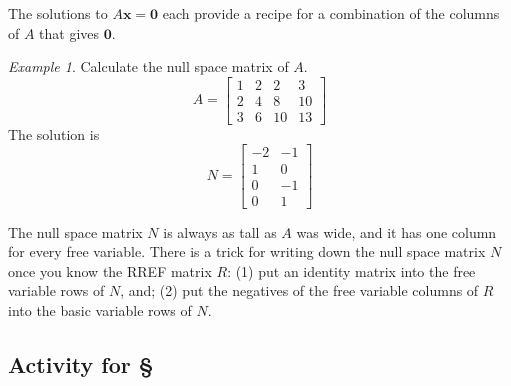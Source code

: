 \documentclass[11pt,oneside]{amsbook}
\theoremstyle{definition}
\theoremstyle{plain}
\theoremstyle{definition}
\theoremstyle{remark}
\newtheorem{example}[theorem]{Example}
\numberwithin{equation}{section}
\numberwithin{figure}{section}
\begin{document}
The solutions to $A\bm{x}=\bm{0}$ each provide a recipe for a combination of the columns of $A$ that gives $\bm{0}$.

\begin{example}
  Calculate the null space matrix of $A$.
  \[A=\begin{bmatrix}1&2&2&3\\2&4&8&10\\3&6&10&13\end{bmatrix}
  \]
  The solution is
  \[N=\begin{bmatrix}-2&-1\\1&0\\0&-1\\0&1\end{bmatrix}
  \]
\end{example}

The null space matrix $N$ is always as tall as $A$ was wide, and it has one column for every free variable. There is a trick for writing down the null space matrix $N$ once you know the RREF matrix $R$: (1) put an identity matrix into the free variable rows of $N$, and; (2) put the negatives of the free variable columns of $R$ into the basic variable rows of $N$.

\newpage
\subsection*{Activity for \S \thesection}
\end{document}
